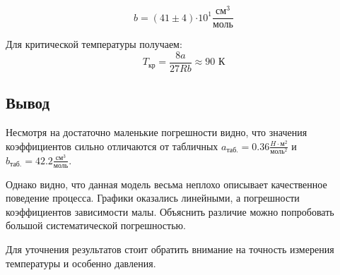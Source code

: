 \documentclass[12pt,a4paper]{article}
\newcommand{\e}[1]{\text{$\cdot10^{#1}$}}
\begin{document}
$$b = (41 \pm 4)\e{1} \frac{\text{см}^3}{\text{моль}}$$

Для критической температуры получаем:
$$T_\text{кр} = \frac{8a}{27Rb} \approx 90 \text{ К}$$













\subsection*{Вывод}

Несмотря на достаточно маленькие погрешности видно, что значения коэффициентов сильно отличаются от табличных $a_\text{таб.} = 0.36\frac{H\cdot\text{м}^2}{\text{моль}^2}$ и $b_\text{таб.}= 42.2\frac{\text{см}^3}{\text{моль}}$.

Однако видно, что данная модель весьма неплохо описывает качественное поведение процесса. Графики оказались линейными, а погрешности коэффициентов зависимости малы. 
Объяснить различие можно попробовать большой систематической погрешностью. 

Для уточнения результатов стоит обратить внимание на точность измерения температуры и особенно давления.
\end{document}
